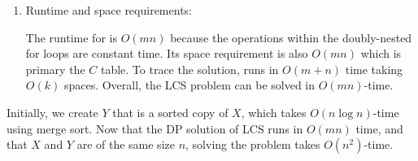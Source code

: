 \documentclass[11pt]{article}
\theoremstyle{definition}
\theoremstyle{theorem}
\begin{document}
\begin{enumerate}[label=(\arabic*)]
\item Runtime and space requirements:

The runtime for  is $O(mn)$ because the operations within the doubly-nested for loops are constant time. Its space requirement is also $O(mn)$ which is primary the $C$ table. To trace the solution,  runs in $O(m + n)$ time taking $O(k)$ spaces. Overall, the LCS problem can be solved in $O(mn)$-time.
\end{enumerate}

Initially, we create $Y$ that is a sorted copy of $X$, which takes $O(n\log n)$-time using merge sort. Now that the DP solution of LCS runs in $O(mn)$ time, and that $X$ and $Y$ are of the same size $n$, solving the problem takes $O(n^2)$-time.
\end{document}
